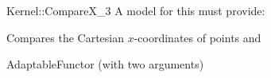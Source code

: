 \begin{ccRefFunctionObjectConcept}{Kernel::CompareX_3}
A model for this must provide:


      {Compares the Cartesian $x$-coordinates of points  and
      }

\ccRefines
AdaptableFunctor (with two arguments)

\ccSeeAlso
{}  \\

\end{ccRefFunctionObjectConcept}
